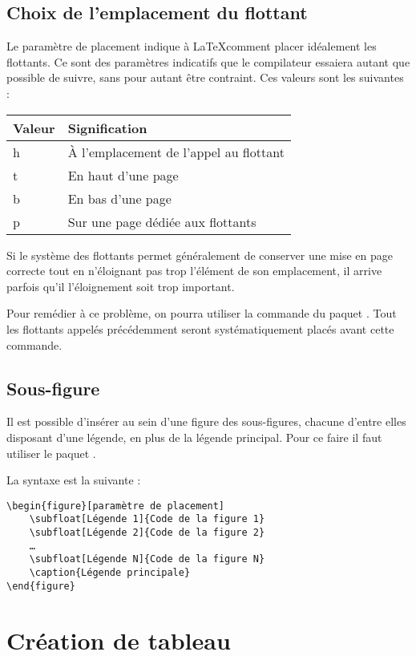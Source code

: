 \begin{description}
\subsection{Choix de l'emplacement du flottant}

Le paramètre de placement indique à \LaTeX comment placer idéalement les flottants. Ce sont des paramètres indicatifs que le compilateur essaiera autant que possible de suivre, sans pour autant être contraint. Ces valeurs sont les suivantes :

\begin{longtable}{l|l}
	Valeur & Signification	\\
	\hline
	\endhead
	h 	& À l'emplacement de l'appel au flottant 	\\
	t 	& En haut d'une page				\\
	b 	& En bas d'une page				\\
	p 	& Sur une page dédiée aux flottants		\\
\end{longtable}


Si le système des flottants permet généralement de conserver une mise en page correcte tout en n'éloignant pas trop l'élément de son emplacement, il arrive parfois qu'il l'éloignement soit trop important.

Pour remédier à ce problème, on pourra utiliser la commande  du paquet . 
Tout les flottants appelés précédemment seront systématiquement placés avant cette commande.

\subsection{Sous-figure}

Il est possible d'insérer au sein d'une figure des sous-figures, chacune d'entre elles disposant d'une légende, en plus de la légende principal.
Pour ce faire il faut utiliser le paquet .

La syntaxe est la suivante :  
\begin{verbatim}
\begin{figure}[paramètre de placement]
	\subfloat[Légende 1]{Code de la figure 1}
	\subfloat[Légende 2]{Code de la figure 2}
	…
	\subfloat[Légende N]{Code de la figure N}
	\caption{Légende principale}
\end{figure} 
\end{verbatim}

\section{Création de tableau}


\end{description}

